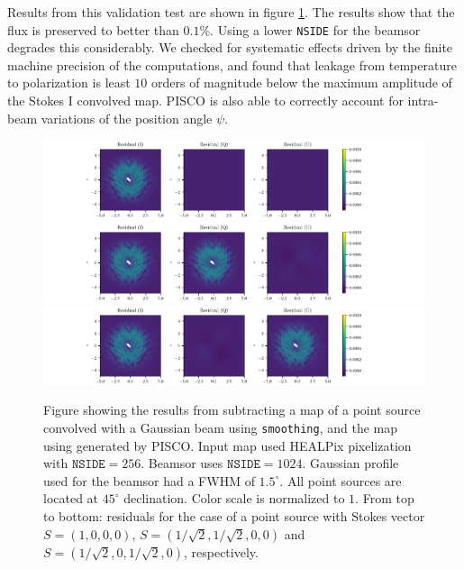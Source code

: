 \documentclass[a4paper,11pt]{article}
\begin{document}
Results from this validation test are shown in figure \ref{fig::stokesqsource256beam1024dec45}. The results show that the flux is preserved to better than $0.1\%$. Using a lower \texttt{NSIDE} for the beamsor degrades this considerably. We checked for systematic effects driven by the finite machine precision of the computations, and found that leakage from temperature to polarization is least $10$ orders of magnitude below the maximum amplitude of the Stokes I convolved map. PISCO is also able to correctly account for intra-beam variations of the position angle $\psi$.

\begin{figure}
	\centering
	\includegraphics[width=1.0\linewidth]{figures/stokes_I_source_256_beam_1024_dec_45.pdf}
	\includegraphics[width=1.0\linewidth]{figures/stokes_Q_source_256_beam_1024_dec_45.pdf}
	\includegraphics[width=1.0\linewidth]{figures/stokes_U_source_256_beam_1024_dec_45.pdf}
	\caption{Figure showing the results from subtracting a map of a point source convolved with a Gaussian beam using \texttt{smoothing}, and the map using generated by PISCO. Input map used HEALPix pixelization with $\mathrm{\texttt{NSIDE}} = 256$. Beamsor uses $\mathrm{\texttt{NSIDE}} = 1024$. Gaussian profile used for the beamsor had a FWHM of $1.5^\circ$. All point sources are located at $45^\circ$ declination. Color scale is normalized to $1$. From top to bottom: residuals for the case of a point source with Stokes vector $S = (1,0,0,0)$, $S=(1/\sqrt{2},1/\sqrt{2},0,0)$ and $S=(1/\sqrt{2},0,1/\sqrt{2},0)$, respectively.}
	\label{fig::stokesqsource256beam1024dec45}
\end{figure}
\end{document}
